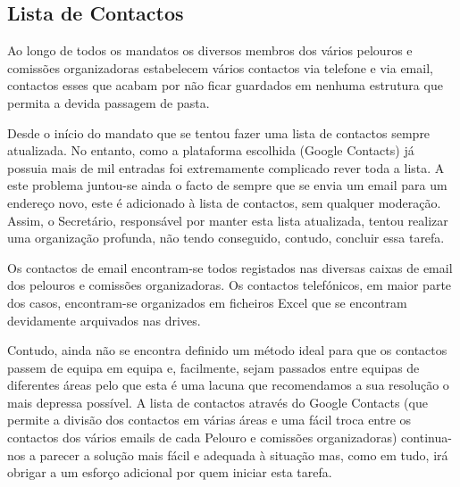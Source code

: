 
\subsection{Lista de Contactos}

Ao longo de todos os mandatos os diversos membros dos vários pelouros e comissões organizadoras estabelecem vários contactos via telefone e via email, contactos esses que acabam por não ficar guardados em nenhuma estrutura que permita a devida passagem de pasta. 

Desde o início do mandato que se tentou fazer uma lista de contactos sempre atualizada. No entanto, como a plataforma escolhida (Google Contacts) já possuia mais de mil entradas foi extremamente complicado rever toda a lista. A este problema juntou-se ainda o facto de sempre que se envia um email para um endereço novo, este é adicionado à lista de contactos, sem qualquer moderação. Assim, o Secretário, responsável por manter esta lista atualizada, tentou realizar uma organização profunda, não tendo conseguido, contudo, concluir essa tarefa.

Os contactos de email encontram-se todos registados nas diversas caixas de email dos pelouros e comissões organizadoras. Os contactos telefónicos, em maior parte dos casos, encontram-se organizados em ficheiros Excel que se encontram devidamente arquivados nas drives.

Contudo, ainda não se encontra definido um método ideal para que os contactos passem de equipa em equipa e, facilmente, sejam passados entre equipas de diferentes áreas pelo que esta é uma lacuna que recomendamos a sua resolução o mais depressa possível. A lista de contactos através do Google Contacts (que permite a divisão dos contactos em várias áreas e uma fácil troca entre os contactos dos vários emails de cada Pelouro e comissões organizadoras) continua-nos a parecer a solução mais fácil e adequada à situação mas, como em tudo, irá obrigar a um esforço adicional por quem iniciar esta tarefa.